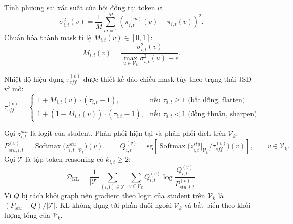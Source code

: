 \documentclass[12pt,a4paper]{article}
\theoremstyle{plain}
\DeclareMathOperator{\KL}{KL}
\DeclareMathOperator{\Softmax}{Softmax}
\newcommand{\Vk}{\mathcal V_k}
\newcommand{\sg}[1]{\mathrm{sg}\!\left[#1\right]}
\begin{document}
Tính phương sai xác suất của hội đồng tại token $v$:
\begin{equation}
\label{eq:variance}
\sigma^2_{i,t}(v) = \frac{1}{M}\sum_{m=1}^M \left(\pi^{(m)}_{i,t}(v) - \bar\pi_{i,t}(v)\right)^2.
\end{equation}
Chuẩn hóa thành mask tỉ lệ $M_{i,t}(v) \in [0,1]$:
\begin{equation}
\label{eq:mask}
M_{i,t}(v) = \frac{\sigma^2_{i,t}(v)}{\max_{u \in \Vk} \sigma^2_{i,t}(u) + \epsilon}.
\end{equation}

Nhiệt độ hiệu dụng $\tau_{eff}^{(v)}$ được thiết kế đảo chiều mask tùy theo trạng thái JSD vĩ mô:
\begin{equation}
\label{eq:tau_eff}
\tau_{eff}^{(v)} =
\begin{cases}
1 + M_{i,t}(v) \cdot (\tau_{i,t} - 1), & \text{nếu } \tau_{i,t} \ge 1 \text{ (bất đồng, flatten)} \\
1 + (1 - M_{i,t}(v)) \cdot (\tau_{i,t} - 1), & \text{nếu } \tau_{i,t} < 1 \text{ (đồng thuận, sharpen)}
\end{cases}
\end{equation}

Gọi $z^{stu}_{i,t}$ là logit của student. Phân phối hiện tại và phân phối đích trên $\Vk$:
\begin{equation}
\label{eq:self_target}
P^{(v)}_{stu,i,t}=\Softmax\!\big(z^{stu}_{i,t}\big|_{\Vk}\big)(v),\qquad
Q^{(v)}_{i,t}=\sg{\Softmax\!\big(z^{stu}_{i,t}\big|_{\Vk}/\tau_{eff}^{(v)}\big)(v)},\qquad v\in\Vk.
\end{equation}
Gọi $\mathcal T$ là tập token reasoning có $k_{i,t}\ge2$:
\begin{equation}
\label{eq:kl_loss}
\mathcal D_{\KL}=\frac1{|\mathcal T|}\sum_{(i,t)\in\mathcal T}\ \sum_{v\in\Vk}Q^{(v)}_{i,t}\log\frac{Q^{(v)}_{i,t}}{P^{(v)}_{stu,i,t}}.
\end{equation}
Vì $Q$ bị tách khỏi graph nên gradient theo logit của student trên $\Vk$ là $(P_{stu}-Q)/|\mathcal T|$. KL không đụng tới phần đuôi ngoài $\Vk$ và bất biến theo khối lượng tổng của $\Vk$.
\end{document}
